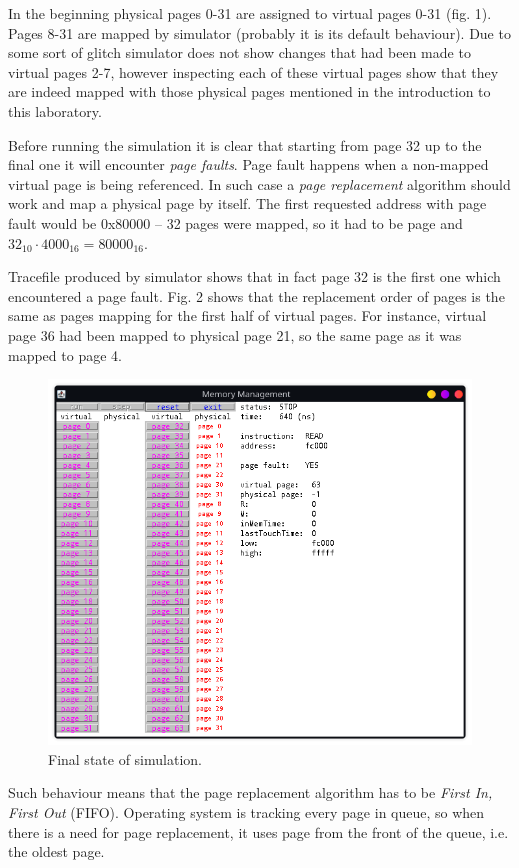 \documentclass{article}
\begin{document}
In the beginning physical pages 0-31 are assigned to virtual pages 0-31 (fig. 1). Pages 
8-31 are mapped by simulator (probably it is its default behaviour). Due
to some sort of glitch simulator does not show changes that had been made to virtual pages
2-7, however inspecting each of these virtual pages show that they are indeed mapped with
those physical pages mentioned in the introduction to this laboratory.

Before running the simulation it is clear that starting from page 32 up to the final one
it will encounter \emph{page faults}. Page fault happens when a non-mapped virtual page
is being referenced. In such case a \emph{page replacement} algorithm should work and
map a physical page by itself. The first requested address with page fault would be
0x80000 -- 32 pages were mapped, so it had to be  page and $32_{10} \cdot 4000_{16} = 80000_{16}$.

Tracefile produced by simulator shows that in fact page 32 is the first one which encountered
a page fault. Fig. 2 shows that the replacement order of pages is the same as pages mapping
for the first half of virtual pages. For instance, virtual page 36 had been mapped to physical
page 21, so the same page as it was mapped to page 4.
\newpage
\begin{figure}[h!]
    \centering
        \includegraphics[width=0.7\linewidth]{img/final_state.png}
    \caption{Final state of simulation.}
\end{figure}

Such behaviour means that the page replacement algorithm has to be \emph{First In, First Out} (FIFO).
Operating system is tracking every page in queue, so when there is a need for page replacement,
it uses page from the front of the queue, i.e. the oldest page.
\end{document}
